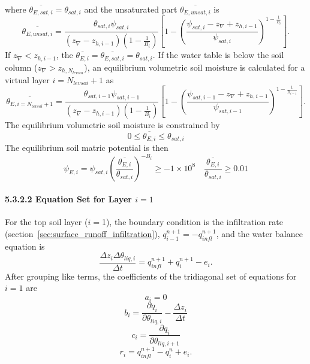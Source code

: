 \documentclass[12pt,authoryear]{elsarticle}
\numberwithin{equation}{section} %
\begin{document}
where $\overline{\theta_{E,sat,i}}=\theta_{sat,i}$ and the unsaturated part $\overline{\theta_{E,unsat,i}}$ is 
\begin{equation}
\overline{\theta_{E,unsat,i}} = \frac{\theta_{sat,i}\psi_{sat,i}}{(z_{\nabla}-z_{h,i-1})(1-\frac{1}{B_{i}})}\left[1-\left(\frac{\psi_{sat,i}-z_{\nabla}+z_{h,i-1}}{\psi_{sat,i}}\right)^{1-\frac{1}{B_{i}}}\right].
\end{equation}
If $z_{\nabla}<z_{h,i-1}$, the $\overline{\theta_{E,i}}=\overline{\theta_{E,sat,i}}=\theta_{sat,i}$. If the water table is below the soil column ($z_{\nabla}>z_{h,N_{levsoi}}$), an equilibrium volumetric soil moisture is calculated for a virtual layer $i=N_{levsoi}+1$ as
\begin{equation}
\label{eq:equilibrium_volumetric_soil_moisture}
\overline{\theta_{E,i=N_{levsoi}+1}} = \frac{\theta_{sat,i-1}\psi_{sat,i-1}}{(z_{\nabla}-z_{h,i-1})(1-\frac{1}{B_{i}})}\left[1-\left(\frac{\psi_{sat,i-1}-z_{\nabla}+z_{h,i-1}}{\psi_{sat,i-1}}\right)^{1-\frac{1}{B_{i-1}}}\right].
\end{equation}
The equilibrium volumetric soil moisture is constrained by
\begin{equation}
0\leq \overline{\theta_{E,i}}\leq \theta_{sat,i}
\end{equation}
The equilibrium soil matric potential is then
\begin{equation}
\label{eq:equilibrium_soil_matric_potential2}
\psi_{E,i}=\psi_{sat,i}\left(\frac{\overline{\theta_{E,i}}}{\theta_{sat,i}}\right)^{-B_{i}}\geq -1\times10^{8} \quad \frac{\overline{\theta_{E,i}}}{\theta_{sat,i}}\geq0.01
\end{equation}

\paragraph{5.3.2.2 Equation Set for Layer $i=1$}
%
For the top soil layer ($i=$1), the boundary condition is the infiltration rate (section~\ref{sec:surface_runoff_infiltration}), $q_{i-1}^{n+1}=-q_{infl}^{n+1}$, and the water balance equation is
\begin{equation}
\frac{\Delta z_{i}\Delta \theta_{liq,i}}{\Delta t} = q_{infl}^{n+1}+q_{i}^{n+1}-e_{i}.
\end{equation}
After grouping like terms, the coefficients of the tridiagonal set of equations for $i=1$ are 
\begin{equation}
a_{i} = 0
\end{equation}
\begin{equation}
b_{i} = \frac{\partial q_{i}}{\partial \theta_{liq,i}} - \frac{\Delta z_{i}}{\Delta t}
\end{equation}
\begin{equation}
c_{i} = \frac{\partial q_{i}}{\partial \theta_{liq,i+1}}
\end{equation}
\begin{equation}
r_{i} = q_{infl}^{n+1}-q_{i}^{n}+e_{i}.
\end{equation}
\end{document}
